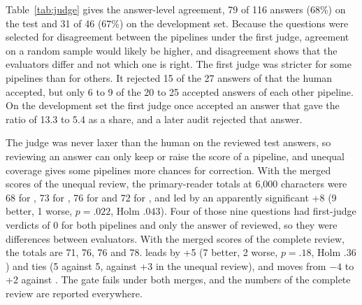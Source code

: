 Table~\ref{tab:judge} gives the answer-level agreement, 79 of 116 answers (68\%) on the test and 31 of 46 (67\%) on the development set.
Because the questions were selected for disagreement between the pipelines under the first judge, agreement on a random sample would likely be higher, and disagreement shows that the evaluators differ and not which one is right.
The first judge was stricter for some pipelines than for others.
It rejected 15 of the 27 answers of \setr{} that the human accepted, but only 6 to 9 of the 20 to 25 accepted answers of each other pipeline.
On the development set the first judge once accepted an answer that gave the ratio of 13.3 to 5.4 as a share, and a later audit rejected that answer.


The judge was never laxer than the human on the reviewed test answers, so reviewing an answer can only keep or raise the score of a pipeline, and unequal coverage gives some pipelines more chances for correction.
With the merged scores of the unequal review, the primary-reader totals at 6,000 characters were 68 for \hybrid{}, 73 for \hr{}, 76 for \lexb{} and 72 for \setr{}, and \lexb{} led \hybrid{} by an apparently significant +8 (9 better, 1 worse, $p=.022$, Holm $.043$).
Four of those nine questions had first-judge verdicts of 0 for both pipelines and only the answer of \lexb{} reviewed, so they were differences between evaluators.
With the merged scores of the complete review, the totals are 71, 76, 76 and 78.
\lexb{} leads \hybrid{} by +5 (7 better, 2 worse, $p=.18$, Holm $.36$) and ties \hr{} (5 against 5, against +3 in the unequal review), and \setr{} moves from $-4$ to +2 against \lexb{}.
The gate fails under both merges, and the numbers of the complete review are reported everywhere.

